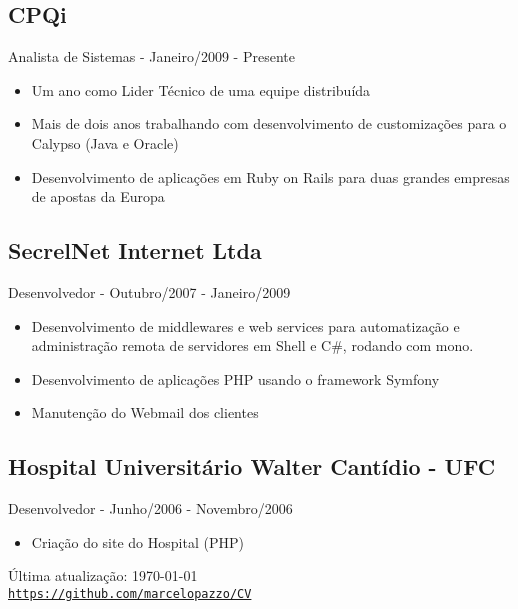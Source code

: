 \documentclass[letterpaper]{article}
\def\footerlink{https://github.com/marcelopazzo/CV}
\begin{document}
\subsection*{CPQi}
Analista de Sistemas - Janeiro/2009 - Presente
\begin{itemize}
\item Um ano como Lider Técnico de uma equipe distribuída
\item Mais de dois anos trabalhando com desenvolvimento de customizações para o Calypso (Java e Oracle)
\item Desenvolvimento de aplicações em Ruby on Rails para duas grandes empresas de apostas da Europa 
\end{itemize}

\subsection*{SecrelNet Internet Ltda}
 Desenvolvedor - Outubro/2007 - Janeiro/2009
\begin{itemize}
\item Desenvolvimento de middlewares e web services para automatização e administração remota de servidores em Shell e C\#, rodando com mono.
\item Desenvolvimento de aplicações PHP usando o framework Symfony
\item Manutenção do Webmail dos clientes
\end{itemize}

\subsection*{Hospital Universitário Walter Cantídio - UFC}
Desenvolvedor - Junho/2006 - Novembro/2006
\begin{itemize}
\item Criação do site do Hospital (PHP)
\end{itemize}

\bigskip

\begin{center}
  \begin{footnotesize}
    Última atualização: \today \\
    \href{\footerlink}{\texttt{\footerlink}}
  \end{footnotesize}
\end{center}
\end{document}

